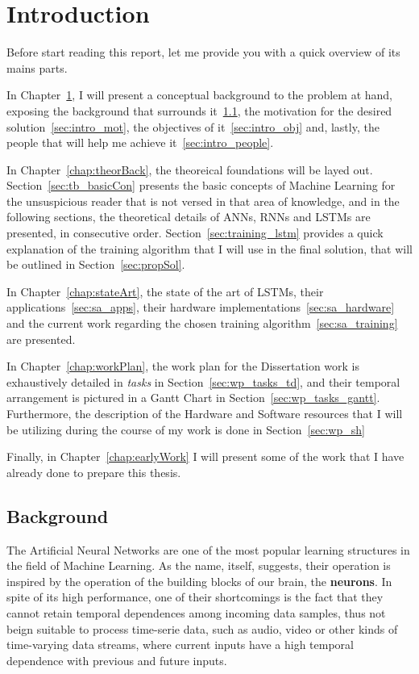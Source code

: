 \chapter{Introduction}\label{chap:intro}
Before start reading this report, let me provide you with a quick overview of its mains parts. 

In Chapter~\ref{chap:intro}, I will present a conceptual background to the problem at hand, exposing the background that surrounds it~\ref{sec:intro_back}, the motivation for the desired solution~\ref{sec:intro_mot}, the objectives of it~\ref{sec:intro_obj} and, lastly, the people that will help me achieve it~\ref{sec:intro_people}.

In Chapter~\ref{chap:theorBack}, the theoreical foundations will be layed out. Section~\ref{sec:tb_basicCon} presents the basic concepts of Machine Learning for the unsuspicious reader that is not versed in that area of knowledge, and in the following sections, the theoretical details of ANNs, RNNs and LSTMs are presented, in consecutive order. Section~\ref{sec:training_lstm} provides a quick explanation of the training algorithm that I will use in the final solution, that will be outlined in Section~\ref{sec:propSol}.

In Chapter~\ref{chap:stateArt}, the state of the art of LSTMs, their applications~\ref{sec:sa_apps}, their hardware implementations~\ref{sec:sa_hardware} and the current work regarding the chosen training algorithm~\ref{sec:sa_training} are presented.

In Chapter~\ref{chap:workPlan}, the work plan for the Dissertation work is exhaustively detailed in \emph{tasks} in Section~\ref{sec:wp_tasks_td}, and their temporal arrangement is pictured in a Gantt Chart in Section~\ref{sec:wp_tasks_gantt}. Furthermore, the description of the Hardware and Software resources that I will be utilizing during the course of my work is done in Section~\ref{sec:wp_sh}

Finally, in Chapter~\ref{chap:earlyWork} I will present some of the work that I have already done to prepare this thesis.

\section{Background}\label{sec:intro_back}
The Artificial Neural Networks are one of the most popular learning structures in the field of Machine Learning. As the name, itself, suggests, their operation is inspired by the operation of the building blocks of our brain, the \textbf{neurons}. In spite of its high performance, one of their shortcomings is the fact that they cannot retain temporal dependences among incoming data samples, thus not beign suitable to process time-serie data, such as audio, video or other kinds of time-varying data streams, where current inputs have a high temporal dependence with previous and future inputs. 

